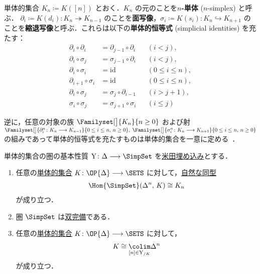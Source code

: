 \documentclass[TQFT_main]{subfiles}
\begin{document}
\begin{mydef}[label=def:SimpSet,breakable]{単体的集合}
    $K_n \coloneqq K([n])$ とおく．$K_n$ の元のことを\textbf{$n$-単体} ($n$-simplex) と呼ぶ．
    $\partial_i \coloneqq K(d_i) \colon K_{n} \twoheadrightarrow K_{n-1}$ のことを\textbf{面写像}，$\sigma_i \coloneqq K(s_i) \colon K_n \hookrightarrow K_{n+1}$ のことを\textbf{縮退写像}と呼ぶ．これらは以下の\textbf{単体的恒等式} (simplicial identities) を充たす：
    \begin{align}
        \partial_i \circ \partial_i &= \partial_{j-1} \circ \partial_i&& (i<j), \\
        \partial_i \circ \sigma_j &= \sigma_{j-1} \circ \partial_i && (i<j), \\
        \partial_i \circ \sigma_i &= \mathrm{id} &&(0\le i \le n), \\
        \partial_{i+1} \circ \sigma_i &= \mathrm{id} &&(0\le i \le n), \\
        \partial_i \circ \sigma_j &= \sigma_j \circ \partial_{i-1} &&(i > j+1), \\
        \sigma_i \circ \sigma_j &= \sigma_{j+1} \circ \sigma_i &&(i \le j)
    \end{align}
\end{mydef}

逆に，任意の対象の族 $\Familyset[\big]{K_n}{n \ge 0}$ および射 $\Familyset[\big]{\partial^n_i \colon K_n \lto K_{n-1}}{0 \le i \le n,\, n \ge 0},\; \Familyset[\big]{\sigma^n_i \colon K_n \lto K_{n+1}}{0 \le i \le n,\, n \ge 0}$ の組みであって単体的恒等式を充たすものは単体的集合を一意に定める~\cite[Proposition 1.1.2.14]{Kerodon}．

\begin{myprop}[label=prop:SimpSet-basic]{単体的集合の圏の基本性質}
    $\mathrm{Y} \colon \Delta \lto \SimpSet$ を\hyperref[def:representable]{米田埋め込み}とする．
    \begin{enumerate}
        \item 任意の\hyperref[def:SimpSet]{単体的集合} $K \colon \OP{\Delta} \lto \SETS$ に対して，\hyperref[def:nat]{自然な同型}
        \begin{align}
            \Hom{\SimpSet} (\Delta^n,\, K) \cong K_n
        \end{align}
        が成り立つ．
        \item 圏 \hyperref[def:SimpSet]{$\SimpSet$} は\hyperref[def:complete]{双完備}である．
        \item 任意の\hyperref[def:SimpSet]{単体的集合} $K \colon \OP{\Delta} \lto \SETS$ に対して，
        \begin{align}
            K \cong \underset{[n] \in \mathrm{Y}_{/K}}{\colim} \Delta^n
        \end{align}
        が成り立つ．
    \end{enumerate}
    
\end{myprop}
\end{document}
